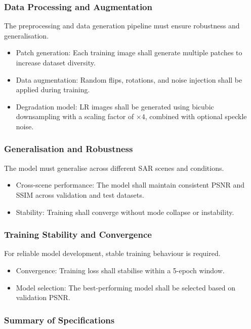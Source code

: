 \documentclass[conference]{IEEEtran}
\begin{document}
\subsubsection{Data Processing and Augmentation}

The preprocessing and data generation pipeline must ensure robustness and generalisation.

\begin{itemize}
    \item Patch generation: Each training image shall generate multiple patches to increase dataset diversity.
    \item Data augmentation: Random flips, rotations, and noise injection shall be applied during training.
    \item Degradation model: LR images shall be generated using bicubic downsampling with a scaling factor of $\times4$, combined with optional speckle noise.
\end{itemize}

\subsubsection{Generalisation and Robustness}

The model must generalise across different SAR scenes and conditions.

\begin{itemize}
    \item Cross-scene performance: The model shall maintain consistent PSNR and SSIM across validation and test datasets.
    \item Stability: Training shall converge without mode collapse or instability.
\end{itemize}

\subsubsection{Training Stability and Convergence}

For reliable model development, stable training behaviour is required.

\begin{itemize}
    \item Convergence: Training loss shall stabilise within a 5-epoch window.
    \item Model selection: The best-performing model shall be selected based on validation PSNR.
\end{itemize}

\subsubsection{Summary of Specifications}
\end{document}
